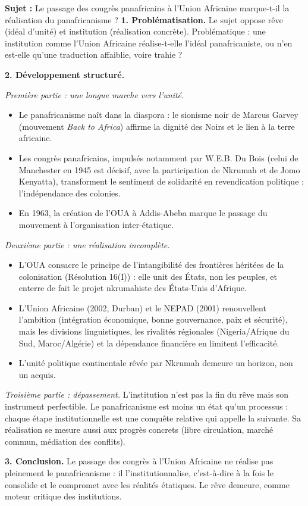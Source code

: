 \documentclass[11pt]{article}
\newcommand{\cle}[1]{{\popxbold\color{popdark}#1}}
\begin{document}
\begin{exoresolu}
\textbf{Sujet :} Le passage des congrès panafricains à l'Union Africaine marque-t-il la réalisation du panafricanisme ?
\tcblower
\textbf{1. Problématisation.} Le sujet oppose \cle{rêve} (idéal d'unité) et \cle{institution} (réalisation concrète). Problématique : une institution comme l'Union Africaine réalise-t-elle l'idéal panafricaniste, ou n'en est-elle qu'une traduction affaiblie, voire trahie ?

\textbf{2. Développement structuré.}

\emph{Première partie : une longue marche vers l'unité.}
\begin{itemize}
\item Le panafricanisme naît dans la diaspora : le \cle{sionisme noir} de Marcus Garvey (mouvement \emph{Back to Africa}) affirme la dignité des Noirs et le lien à la terre africaine.
\item Les congrès panafricains, impulsés notamment par W.E.B. Du Bois (celui de Manchester en 1945 est décisif, avec la participation de Nkrumah et de Jomo Kenyatta), transforment le sentiment de solidarité en revendication politique : l'indépendance des colonies.
\item En 1963, la création de l'OUA à Addis-Abeba marque le passage du mouvement à l'organisation inter-étatique.
\end{itemize}

\emph{Deuxième partie : une réalisation incomplète.}
\begin{itemize}
\item L'OUA consacre le principe de l'intangibilité des frontières héritées de la colonisation (Résolution 16(I)) : elle unit des États, non les peuples, et enterre de fait le projet nkrumahiste des États-Unis d'Afrique.
\item L'Union Africaine (2002, Durban) et le NEPAD (2001) renouvellent l'ambition (intégration économique, bonne gouvernance, paix et sécurité), mais les divisions linguistiques, les rivalités régionales (Nigeria/Afrique du Sud, Maroc/Algérie) et la dépendance financière en limitent l'efficacité.
\item L'unité politique continentale rêvée par Nkrumah demeure un horizon, non un acquis.
\end{itemize}

\emph{Troisième partie : dépassement.} L'institution n'est pas la fin du rêve mais son instrument perfectible. Le panafricanisme est moins un état qu'un processus : chaque étape institutionnelle est une conquête relative qui appelle la suivante. Sa réalisation se mesure aussi aux progrès concrets (libre circulation, marché commun, médiation des conflits).

\textbf{3. Conclusion.} Le passage des congrès à l'Union Africaine ne réalise pas pleinement le panafricanisme : il l'institutionnalise, c'est-à-dire à la fois le consolide et le compromet avec les réalités étatiques. Le rêve demeure, comme moteur critique des institutions.
\end{exoresolu}
\end{document}
